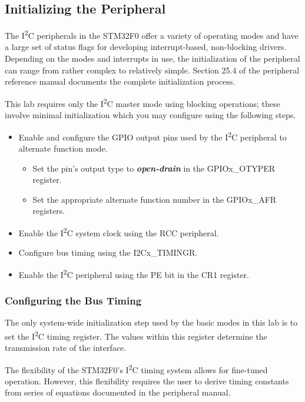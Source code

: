 \documentclass[openany,11pt,fleqn]{book} %
\begin{document}
\subsection{Initializing the Peripheral} \label{i2c_init}
   
    The I\textsuperscript{2}C peripherals in the STM32F0 offer a variety of operating modes and have a large set of status flags for developing interrupt-based, non-blocking drivers. Depending on the modes and interrupts in use, the initialization of the peripheral can range from rather complex to relatively simple. Section 25.4 of the peripheral reference manual documents the complete initialization process. 
    
    This lab requires only the I\textsuperscript{2}C master mode using blocking operations; these involve minimal initialization which you may configure using the following steps.
    
    \begin{itemize}
        \item Enable and configure the GPIO output pins used by the I\textsuperscript{2}C peripheral to alternate function mode.
        \begin{itemize}
            \item Set the pin's output type to \textbf{\textit{open-drain}} in the GPIOx\_OTYPER register. 
            \item Set the appropriate alternate function number in the GPIOx\_AFR registers. 
        \end{itemize}
        \item Enable the I\textsuperscript{2}C system clock using the RCC peripheral.
        \item Configure bus timing using the I2Cx\_TIMINGR.
        \item Enable the I\textsuperscript{2}C peripheral using the PE bit in the CR1 register.
    \end{itemize} 
     
    \subsubsection{Configuring the Bus Timing}
    The only system-wide initialization step used by the basic modes in this lab is to set the I\textsuperscript{2}C timing register. The values within this register determine the transmission rate of the interface. 
    
    The flexibility of the STM32F0's I\textsuperscript{2}C timing system allows for fine-tuned operation. However, this flexibility requires the user to derive timing constants from series of equations documented in the peripheral manual. 
    
\end{document}
